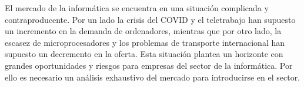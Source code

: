 El mercado de la informática se encuentra en una situación complicada y contraproducente. 
Por un lado la crisis del COVID y el teletrabajo han supuesto un incremento en la demanda de ordenadores, mientras que por otro lado, 
la escasez de microprocesadores y los problemas de transporte internacional han supuesto un decremento en la oferta. 
Esta situación plantea un horizonte con grandes oportunidades y riesgos para empresas del sector de la informática. 
Por ello es necesario un análisis exhaustivo del mercado para introducirse en el sector.
